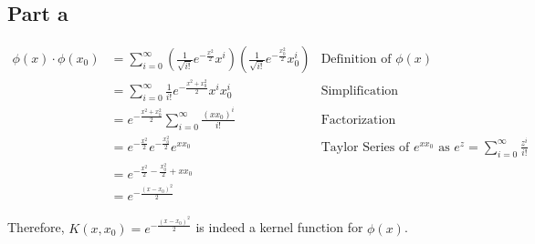 \newpage
\section{}

\subsection*{Part a}
\begin{align*}
    \phi(x) \cdot \phi(x_0) &= \sum_{i=0}^{\infty} \left( \frac{1}{\sqrt{i!}} e^{-\frac{x^2}{2}} x^i \right) \left( \frac{1}{\sqrt{i!}} e^{-\frac{x_0^2}{2}} x_0^i \right) & \text{Definition of $\phi(x)$} \\
    &= \sum_{i=0}^{\infty} \frac{1}{i!} e^{-\frac{x^2 + x_0^2}{2}} x^i x_0^i & \text{Simplification} \\
    &= e^{-\frac{x^2 + x_0^2}{2}} \sum_{i=0}^{\infty} \frac{{(xx_0)}^i}{i!} & \text{Factorization} \\
    &= e^{-\frac{x^2}{2}} e^{-\frac{x_0^2}{2}} e^{xx_0} & \text{Taylor Series of $e^{xx_0}$ as $e^z = \sum_{i=0}^{\infty} \frac{z^i}{i!}$} \\
    &= e^{-\frac{x^2}{2} - \frac{x_0^2}{2} + xx_0}\\
    &= e^{-\frac{{(x - x_0)}^2}{2}}
\end{align*}

    
Therefore, $K(x, x_0) = e^{-\frac{{(x-x_0)}^2}{2}}$ is indeed a kernel function for $ \phi(x)$.
    

